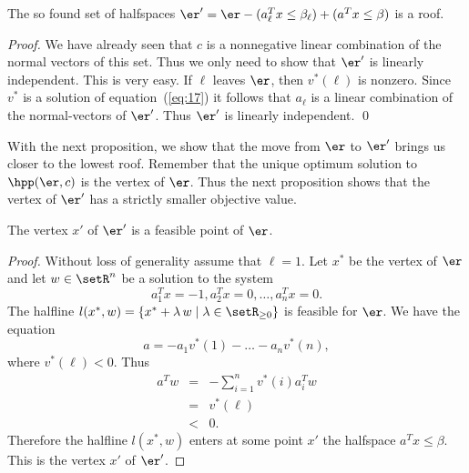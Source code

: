 \begin{lemma}
  \label{lem:1}
  The so found set of halfspaces  $\er' = \er - (a_\ell^Tx\leq\beta_\ell) +
  (a^Tx\leq\beta)$ is a roof. 
\end{lemma}
\begin{proof}
  We have already seen that $c$ is a nonnegative linear combination of
  the normal vectors of this set. Thus we only need to show that
  $\er'$ is linearly independent. This is very easy. If $\ell$ leaves
  $\er$, then $v^*(\ell)$ is nonzero. Since $v^*$ is a solution of
  equation~(\ref{eq:17}) it follows that $a_\ell$ is a linear combination
  of the normal-vectors of $\er'$. Thus $\er'$ is linearly
  independent. 
\qed
\end{proof}

With the next proposition, we show that the move from $\er$ to $\er'$
brings us closer to the lowest roof. Remember that the unique
optimum solution to $\hpp(\er,c)$ is the vertex of $\er$. Thus the
next proposition shows that the vertex of $\er'$ has a strictly
smaller objective value. 


\begin{proposition}
  \label{prop:3}
  The vertex $x'$ of $\er'$ is a feasible point of $\er$.
\end{proposition}

\begin{proof}
  Without loss of generality assume that $\ell =1$. 
  Let $x^*$ be the vertex of $\er$ and let $w \in \setR^n$ be a solution to
  the system 
  \begin{equation}
    \label{eq:15}
    a_1^Tx = -1, a_2^Tx=0,\ldots,a_n^Tx = 0.
  \end{equation}
  The halfline $l(x^*,w) = \{ x^* + \lambda \, w \mid \lambda \in \setR_{\geq0}\}$  is feasible
  for $\er$. We have the equation
  \begin{equation}
    \label{eq:16}
    a = -a_1v^*(1) - \ldots - a_nv^*(n),
  \end{equation}
  where $v^*(\ell) < 0$.  Thus 
  \begin{eqnarray}
    a^T w  & = & - \sum_{i=1}^n v^*(i) a_i^T w \\
          & = &  v^*(\ell) \\
          & < & 0.
  \end{eqnarray}
  Therefore the halfline  $l(x^*,w)$ enters at some point  $x'$ the
  halfspace $a^Tx\leq\beta$. This is the vertex $x'$ of $\er'$. 
\end{proof}

